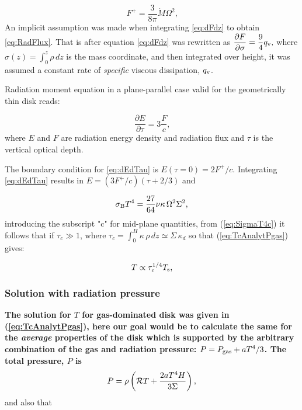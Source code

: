 \documentclass[12pt,english,preprint]{aastex}
\newcommand{\mybf}{\bf}
\newcommand{\su}[2]{#1_{\rm #2}}
\newcommand{\Tc}{T}
\begin{document}
\begin{equation}
F^{+}=\frac{3}{8\pi}\dot{M}\Omega^{2}\mbox{,}\label{eq:RadFlux}
\end{equation}
An implicit assumption was made when integrating \eqref{eq:dFdz} to obtain \eqref{eq:RadFlux}. That is
after equation \eqref{eq:dFdz} was rewritten as
${\displaystyle \frac{\partial F}{\partial\sigma}=\frac{9}{4}q_{{\rm v}}},$
where ${\displaystyle \sigma(z)=\int_{0}^{z}\rho\,dz}$ is the mass
coordinate, and then integrated over height, it was assumed a constant rate of \emph{specific} viscous dissipation, $\su{q}{v}$. 

Radiation moment equation in
a plane-parallel case valid for the geometrically thin disk reads:

\begin{equation}
\frac{\partial E}{\partial\tau}=3\frac{F}{c}\mbox{,}\label{eq:dEdTau}
\end{equation}
where $E$ and $F$ are radiation energy density and radiation flux
and $\tau$ is the vertical optical depth. 

The boundary condition for \eqref{eq:dEdTau} is $E(\tau=0)=2F^+/c$. 
Integrating \eqref{eq:dEdTau} results in $E=(3F^+/c)(\tau+2/3)$ and

\begin{equation}\label{eq:SigmaT4c}
  \su{\sigma}{B}T^4 = \frac{27}{64}\nu\kappa\,\Omega^2\Sigma^2\mbox{,} 
\end{equation} 
introducing the subscript "c" for mid-plane quantities, 
from (\ref{eq:SigmaT4c}) it follows that if $\tau_{c}\gg1$, 
where 
${\displaystyle
\tau_c = \int_{0}^{H}\kappa \, \rho \,dz\simeq \Sigma \, \kappa_d }$
so that (\ref{eq:TcAnalytPgas}) gives: 

\begin{equation}
\Tc\propto\tau_{c}^{1/4}T_{{\rm s}}\mbox{,}\label{eq:TcTauc}
\end{equation}


\subsubsection{Solution with radiation pressure }\label{sec:SolWithRadPressure}


{\mybf
The solution for $\Tc$ for gas-dominated disk
was given in (\ref{eq:TcAnalytPgas}), here our goal would be to
calculate the same for the {\it average} properties of the disk which is 
supported by the arbitrary combination
of the gas and radiation pressure: $P=P_{{\rm gas}}+aT^{4}/3$. 
The total pressure, $P$ is 
}
\begin{equation}
P=\rho\left({\cal R}T+\frac{2aT^{4}H}{3\Sigma}\right)\mbox{,}\label{eq:nuAlphaPtot}
\end{equation}
and also that
\end{document}

